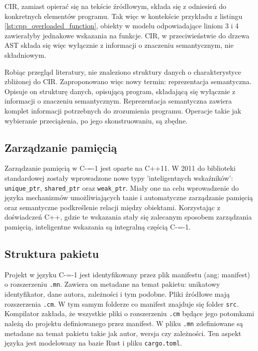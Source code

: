 CIR, zamiast opierać się na tekście źródłowym, składa się z odniesień do konkretnych elementów programu.
Tak więc w kontekście przykładu z listingu \ref{lst:cpp_overloaded_function}, obiekty w modelu odpowiadające liniom 3 i 4 zawierałyby jednakowe wskazania na funkcje.
CIR, w przeciwieństwie do drzewa AST składa się więc wyłącznie z informacji o znaczeniu semantycznym, nie składniowym.

Robiąc przegląd literatury, nie znaleziono struktury danych o charakterystyce zbliżonej do CIR.
Zaproponowano więc nowy termin: reprezentacja semantyczna.
Opisuje on strukturę danych, opisującą program, składającą się wyłącznie z informacji o znaczeniu semantycznym.
Reprezentacja semantyczna zawiera komplet informacji potrzebnych do zrozumienia programu.
Operacje takie jak wybieranie przeciążenia, po jego skonstruowaniu, są zbędne.

\subsection{Zarządzanie pamięcią}
Zarządzanie pamięcią w C-=-1 jest oparte na C++11. W 2011 do biblioteki standardowej zostały wprowadzone nowe typy 'inteligentnych wskaźników': \lstinline{unique_ptr}, \lstinline{shared_ptr} oraz \lstinline{weak_ptr}\cite{ISO:2012:III}.
Miały one na celu wprowadzenie do języka mechanizmów umożliwiających tanie i automatyczne zarządzanie pamięcią oraz semantyczne podkreślenie relacji między obiektami.
Korzystając z doświadczeń C++, gdzie te wskazania stały się zalecanym sposobem zarządzania pamięcią\cite{cpp:core_guidelines}, inteligentne wskazania są integralną częścią C-=-1.
\subsection{Struktura pakietu}\label{struktura_paczki}
Projekt w języku C-=-1 jest identyfikowany przez plik manifestu (ang: manifest) o rozszerzeniu \lstinline{.mn}. 
Zawiera on metadane na temat pakietu: unikatowy identyfikator, dane autora, zależności i tym podobne.
Pliki źródłowe mają rozszerzenia \lstinline{.cm}. W tym samym folderze co manifest znajduje się folder \lstinline{src}. Kompilator zakłada, że wszystkie pliki o rozszerzeniu \lstinline{.cm} będące jego potomkami należą do projektu definiowanego przez manifest.
W pliku \lstinline{.mn} zdefiniowane są metadane na temat pakietu takie jak autor, wersja czy zależności. Ten aspekt języka jest modelowany na bazie Rust i pliku \lstinline{cargo.toml}.
